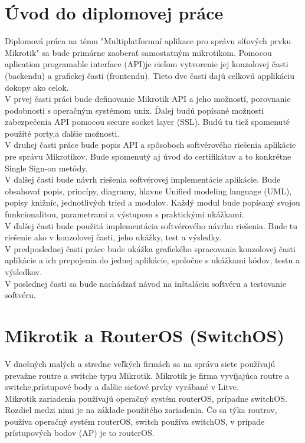 \chapter{Úvod do diplomovej práce}
Diplomová práca na tému "Multiplatformní aplikace pro správu síťových prvku Mikrotik" sa bude primárne zaoberať samostatným mikrotikom. Pomocou aplication programable interface (API)je cieľom  vytvorenie jej konzolovej časti (backendu) a grafickej časti (frontendu). Tieto dve časti dajú celkovú applikáciu dokopy ako celok.\\
V prvej časti práci bude definovanie Mikrotik API a jeho možností, porovnanie podobnosti s operačným systémom unix. Ďalej budú popísané možnosti zabezpečenia API pomocou secure socket layer (SSL). Budú tu tiež spomenuté použité porty,a ďalšie možnosti.\\
V druhej časti práce bude popis API a spôsoboch softvérového riešenia aplikácie pre správu Mikrotikov. Bude spomenutý aj úvod do certifikátov a to konkrétne Single Sign-on metódy.\\
V ďalšej časti bude návrh riešenia softvérovej implementácie aplikácie. Bude obsahovať popis, princípy, diagramy, hlavne Unified modeling language (UML), popisy knižníc, jednotlivých tried a modulov. Každý modul bude popísaný svojou funkcionalitou, parametrami a výstupom s praktickými ukážkami.\\
V ďalšej časti bude použitá implementácia softvérového návrhu riešenia. Bude tu riešenie ako v konzolovej časti, jeho ukážky, test a výsledky. \\
V predposlednej časti práce bude ukážka grafického spracovania konzolovej časti aplikácie a ich prepojenia do jednej aplikácie, spoločne s ukážkami kódov, testu  a výsledkov.\\
V poslednej časti sa bude nachádzať návod na inštaláciu softvéru a testovanie softvéru.
\chapter{Mikrotik a RouterOS (SwitchOS)}
V dnešných malých  a stredne veľkých firmách sa na správu siete používajú prevažne routre a switche typu Mikrotik. Mikrotik je firma vyvíjajúca routre a switche,prístupové body a ďalšie sieťové prvky vyrábané v Litve. \\
Mikrotik zariadenia používajú operačný systém routerOS, prípadne switchOS. Rozdiel medzi nimi je na základe použitého zariadenia. Čo sa týka routrov, používa operačný systém routerOS, switch používa switchOS, v prípade prístupových bodov (AP) je to routerOS. 
